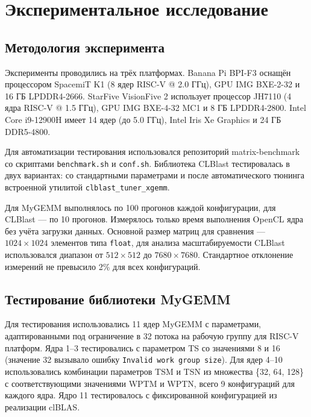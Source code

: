 
\section{Экспериментальное исследование}

\subsection{Методология эксперимента}

Эксперименты проводились на трёх платформах. Banana Pi BPI-F3 оснащён процессором SpacemiT K1 (8 ядер RISC-V @ 2.0 ГГц), GPU IMG BXE-2-32 и 16 ГБ LPDDR4-2666. StarFive VisionFive 2 использует процессор JH7110 (4 ядра RISC-V @ 1.5 ГГц), GPU IMG BXE-4-32 MC1 и 8 ГБ LPDDR4-2800. Intel Core i9-12900H имеет 14 ядер (до 5.0 ГГц), Intel Iris Xe Graphics и 24 ГБ DDR5-4800.

Для автоматизации тестирования использовался репозиторий matrix-benchmark~\cite{matrix_benchmark_repo} со скриптами \texttt{benchmark.sh} и \texttt{conf.sh}. Библиотека CLBlast тестировалась в двух вариантах: со стандартными параметрами и после автоматического тюнинга встроенной утилитой \texttt{clblast\_tuner\_xgemm}.

Для MyGEMM выполнялось по 100 прогонов каждой конфигурации, для CLBlast --- по 10 прогонов. Измерялось только время выполнения OpenCL ядра без учёта загрузки данных. Основной размер матриц для сравнения --- $1024 \times 1024$ элементов типа \texttt{float}, для анализа масштабируемости CLBlast использовался диапазон от $512 \times 512$ до $7680 \times 7680$. Стандартное отклонение измерений не превысило 2\% для всех конфигураций.

\subsection{Тестирование библиотеки MyGEMM}

Для тестирования использовались 11 ядер MyGEMM с параметрами, адаптированными под ограничение в 32 потока на рабочую группу для RISC-V платформ. Ядра 1--3 тестировались с параметром TS со значениями 8 и 16 (значение 32 вызывало ошибку \texttt{Invalid work group size}). Для ядер 4--10 использовались комбинации параметров TSM и TSN из множества \{32, 64, 128\} с соответствующими значениями WPTM и WPTN, всего 9 конфигураций для каждого ядра. Ядро 11 тестировалось с фиксированной конфигурацией из реализации clBLAS.

